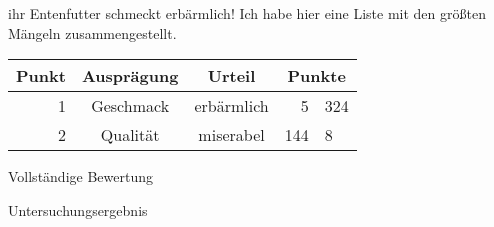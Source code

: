 \documentclass{tfbrief}
\date{\today}
\begin{document}
\begin{letter}
ihr Entenfutter schmeckt erbärmlich! Ich habe hier eine Liste mit den größten Mängeln zusammengestellt.
\begin{center}
\begin{tabularx}{0.7\textwidth}{r|ccr@{,}l}
Punkt & Ausprägung & Urteil & \multicolumn{2}{c}{Punkte} \\ 
\hline
1 & Geschmack & erbärmlich & 5&324 \\ 
2 & Qualität & miserabel & 144&8
\end{tabularx}
\end{center}

\end{letter}

\enlargethispage{1cm}


\begin{attachment}
\item Vollständige Bewertung
\item Untersuchungsergebnis
\end{attachment}
\end{document}
